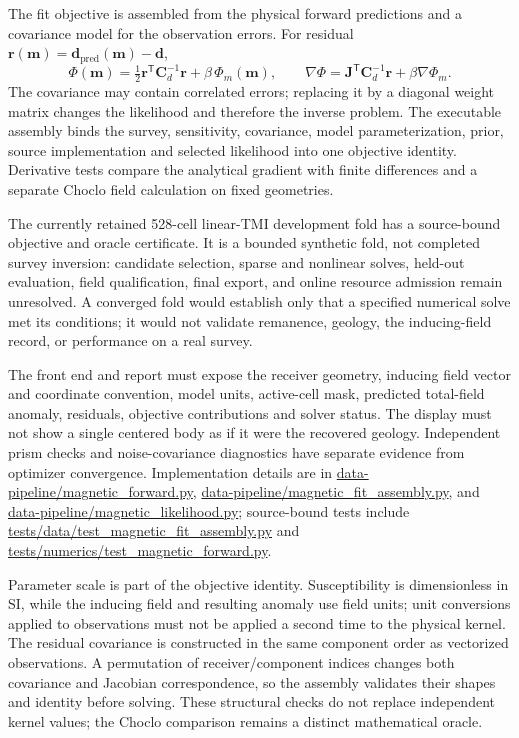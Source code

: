 The fit objective is assembled from the physical forward predictions
and a covariance model for the observation errors. For residual
$\mathbf{r}(\mathbf{m})=\mathbf{d}_{\mathrm{pred}}(\mathbf{m})-\mathbf{d}$,
\begin{equation}
  \Phi(\mathbf{m})=\tfrac12\mathbf{r}^{\mathsf T}\mathbf{C}_d^{-1}\mathbf{r}
  +\beta\,\Phi_m(\mathbf{m}),
  \qquad
  \nabla\Phi=\mathbf{J}^{\mathsf T}\mathbf{C}_d^{-1}\mathbf{r}
  +\beta\nabla\Phi_m.
  \label{eq:magnetic-fit-objective}
\end{equation}
The covariance may contain correlated errors; replacing it by a
diagonal weight matrix changes the likelihood and therefore the inverse
problem. The executable assembly binds the survey, sensitivity,
covariance, model parameterization, prior, source implementation and
selected likelihood into one objective identity. Derivative tests
compare the analytical gradient with finite differences and a separate
Choclo field calculation on fixed geometries.

The currently retained 528-cell linear-TMI development fold has a
source-bound objective and oracle certificate. It is a bounded
synthetic fold, not completed survey inversion: candidate selection,
sparse and nonlinear solves, held-out evaluation, field qualification,
final export, and online resource admission remain unresolved. A
converged fold would establish only that a specified numerical solve
met its conditions; it would not validate remanence, geology, the
inducing-field record, or performance on a real survey.

The front end and report must expose the receiver geometry, inducing
field vector and coordinate convention, model units, active-cell mask,
predicted total-field anomaly, residuals, objective contributions and
solver status. The display must not show a single centered body as if
it were the recovered geology. Independent prism checks and
noise-covariance diagnostics have separate evidence from optimizer
convergence. Implementation details are in
\url{data-pipeline/magnetic_forward.py},
\url{data-pipeline/magnetic_fit_assembly.py}, and
\url{data-pipeline/magnetic_likelihood.py}; source-bound tests include
\url{tests/data/test_magnetic_fit_assembly.py} and
\url{tests/numerics/test_magnetic_forward.py}.

Parameter scale is part of the objective identity. Susceptibility is
dimensionless in SI, while the inducing field and resulting anomaly use
field units; unit conversions applied to observations must not be
applied a second time to the physical kernel. The residual covariance
is constructed in the same component order as vectorized observations.
A permutation of receiver/component indices changes both covariance
and Jacobian correspondence, so the assembly validates their shapes and
identity before solving. These structural checks do not replace
independent kernel values; the Choclo comparison remains a distinct
mathematical oracle.

